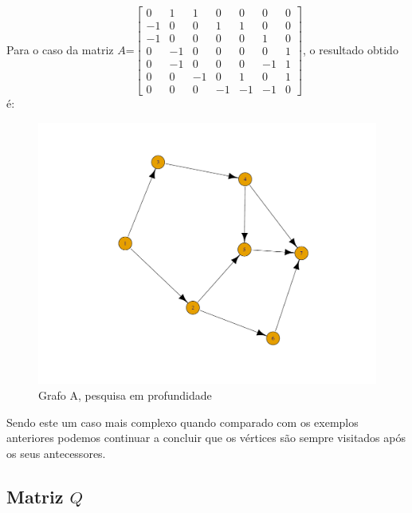 \documentclass[a4paper,12pt]{report}
\begin{document}
Para o caso da matriz $A$=$\begin{bmatrix}
    0&1&1&0&0&0&0\\
    -1&0&0&1&1&0&0\\
    -1&0&0&0&0&1&0\\
    0&-1&0&0&0&0&1\\
    0&-1&0&0&0&-1&1\\
    0&0&-1&0&1&0&1\\
    0&0&0&-1&-1&-1&0
\end{bmatrix}$, o resultado obtido é:
\begin{figure}[H]
    \centering
        \includegraphics[scale=0.22]{img/dfsA.pdf}
    \caption{Grafo A, pesquisa em profundidade}
    \label{fig:dfsP}
\end{figure}

Sendo este um caso mais complexo quando comparado com os exemplos anteriores podemos continuar a concluir que os vértices são sempre visitados após os seus antecessores.

\subsection*{Matriz $Q$}
\end{document}
